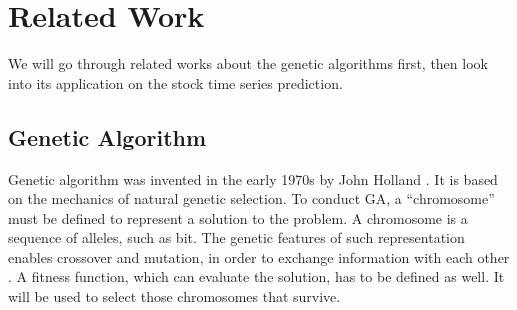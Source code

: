 \documentclass{article}
\begin{document}



\section{Related Work}

We will go through related works about the genetic algorithms first,
then look into its application on the stock time series prediction.

\subsection{Genetic Algorithm}

Genetic algorithm was invented in the early 1970s by John Holland \cite{genetic-algorithm-review-and-application}.
It is based on the mechanics of natural genetic selection.
To conduct GA, a ``chromosome'' must be defined to represent a solution to the problem.
A chromosome is a sequence of alleles, such as bit.
The genetic features of such representation enables crossover and mutation,
in order to exchange information with each other \cite{an-object-oriented-environment-for-specification}.
A fitness function, which can evaluate the solution, has to be defined as well.
It will be used to select those chromosomes that survive.
\end{document}
